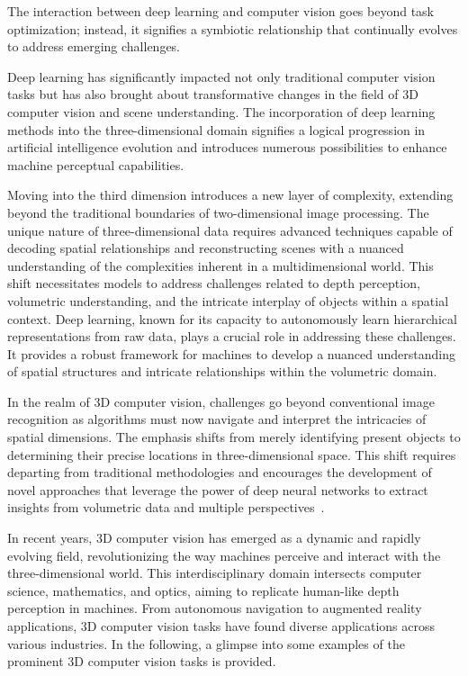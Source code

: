 The interaction between deep learning and computer vision goes beyond task optimization; instead, it signifies a symbiotic relationship that continually evolves to address emerging challenges.

Deep learning has significantly impacted not only traditional computer vision tasks but has also brought about transformative changes in the field of 3D computer vision and scene understanding. The incorporation of deep learning methods into the three-dimensional domain signifies a logical progression in artificial intelligence evolution and introduces numerous possibilities to enhance machine perceptual capabilities.

Moving into the third dimension introduces a new layer of complexity, extending beyond the traditional boundaries of two-dimensional image processing. The unique nature of three-dimensional data requires advanced techniques capable of decoding spatial relationships and reconstructing scenes with a nuanced understanding of the complexities inherent in a multidimensional world. This shift necessitates models to address challenges related to depth perception, volumetric understanding, and the intricate interplay of objects within a spatial context. Deep learning, known for its capacity to autonomously learn hierarchical representations from raw data, plays a crucial role in addressing these challenges. It provides a robust framework for machines to develop a nuanced understanding of spatial structures and intricate relationships within the volumetric domain.

In the realm of 3D computer vision, challenges go beyond conventional image recognition as algorithms must now navigate and interpret the intricacies of spatial dimensions. The emphasis shifts from merely identifying present objects to determining their precise locations in three-dimensional space. This shift requires departing from traditional methodologies and encourages the development of novel approaches that leverage the power of deep neural networks to extract insights from volumetric data and multiple perspectives~\citep{maturana2015voxnet, qi2017pointnet, li2018pointcnn}.

In recent years, 3D computer vision has emerged as a dynamic and rapidly evolving field, revolutionizing the way machines perceive and interact with the three-dimensional world. This interdisciplinary domain intersects computer science, mathematics, and optics, aiming to replicate human-like depth perception in machines. From autonomous navigation to augmented reality applications, 3D computer vision tasks have found diverse applications across various industries. In the following, a glimpse into some examples of the prominent 3D computer vision tasks is provided.

